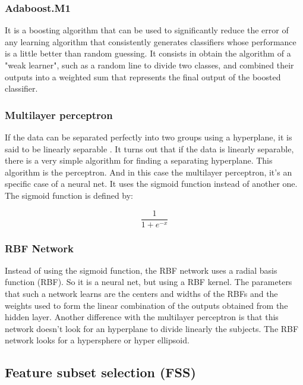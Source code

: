 \documentclass[conference,a4paper]{IEEEtran}
\begin{document}
\subsubsection{Adaboost.M1 \cite{Adaboost}}

It is a boosting algorithm that can be used to significantly reduce the error of any learning algorithm that consistently generates classifiers whose performance is a little better than random guessing. It consists in obtain the algorithm of a "weak learner", such as a random line to divide two classes, and combined their outputs into a weighted sum that represents the final output of the boosted classifier.

\subsubsection{Multilayer perceptron}

If the data can be separated perfectly into two groups using a hyperplane, it is said to be linearly separable \cite{DataMining}. It turns out that if the data is linearly separable, there is a very simple algorithm for finding a separating hyperplane. This algorithm is the perceptron. And in this case the multilayer perceptron, it's an specific case of a neural net. It uses the sigmoid function instead of another one. The sigmoid function is defined by:

\begin{equation}
\frac{1}{1+e^{-x}}
\end{equation}

\subsubsection{RBF Network}

Instead of using the sigmoid function, the RBF network uses a radial basis function (RBF). So it is a neural net, but using a RBF kernel. The parameters that such a network learns are the centers and widths of the RBFs and the weights used to form the linear combination of the outputs obtained from the hidden layer. Another difference with the multilayer perceptron is that this network doesn't look for an hyperplane to divide linearly the subjects. The RBF network looks for a hypersphere or hyper	ellipsoid. 

\subsection{Feature subset selection (FSS)}
\end{document}
